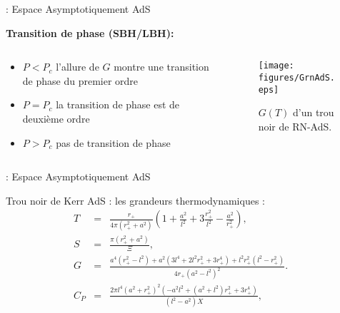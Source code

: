 \begin{frame}{\underline{\secname} : Espace Asymptotiquement AdS}
\begin{center}
		\textbf{Transition de phase (SBH/LBH):}
\end{center}
\begin{columns}
	\begin{column}{0.5\linewidth}
		\begin{itemize} \setlength\itemsep{0.5em}
			\item  $P < P_c$ l’allure de $G$ montre une transition de phase du premier ordre
			\item  $P = P_c$ la transition de phase est de deuxième ordre 
			\item  $P > P_c$ pas de transition de phase
		\end{itemize}	
	\end{column}
	\begin{column}{0.5\linewidth}
\begin{figure}[H]
	\begin{center}

			\texttt{[image: figures/GrnAdS.eps]}
		
		\caption{ $G(T)$ d'un trou noir de RN-AdS.}
	\end{center}
\end{figure}
		
		
	\end{column}
\end{columns}

\end{frame}




\begin{frame}{\underline{\secname} : Espace Asymptotiquement AdS}
\begin{block}{Trou noir de Kerr AdS :}
	les grandeurs thermodynamiques :
\begin{eqnarray*}
T&=&\frac{r_{+}}{4\pi(r_{+}^{2}+a^{2})}
\left(1+\frac{a^{2}}{l^{2}}+3\frac{r_{+}^{2}}{l^{2}}-\frac{a^{2}}{r_{+}^{2}}\right),\\
S&=&\frac{\pi (r_{+}^{2}+a^{2})}{\Xi},\quad 
\\
G&=&\frac{a^4 \left(r_{+}^2-l^{2}\right)+a^2\left(3l^{4}
	+2l^{2}r_{+}^2+3r_{+}^4\right)+l^{2} r_{+}^2
	\left(l^{2}-r_{+}^2\right)}{4 r_{+}\left(a^2-l^{2}\right)^2}.\quad 
\\
C_P &=& \frac{2 \pi l^4  \left(a^2+r_{+}^2\right)^2 \left(-a^2 l^2+\left(a^2+l^2\right) r_{+}^2
	+3 r_{+}^4\right)}{(l^2 -a^2) X},
\end{eqnarray*}
\end{block}
\end{frame}


